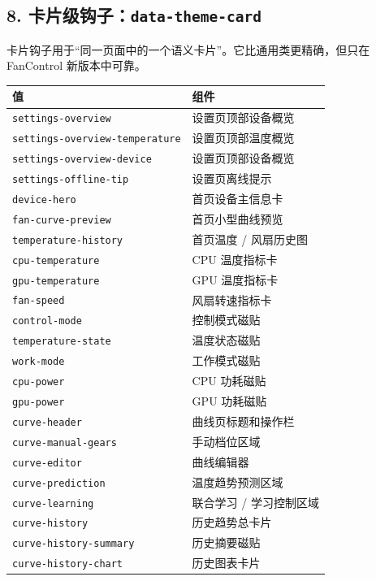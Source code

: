 \documentclass[UTF8,11pt,a4paper]{ctexart}
\begin{document}
\subsection{\texorpdfstring{8.
卡片级钩子：\texttt{data-theme-card}}{8. 卡片级钩子：data-theme-card}}\label{8-ux5361ux7247ux7ea7ux94a9ux5b50data-theme-card}

卡片钩子用于``同一页面中的一个语义卡片''。它比通用类更精确，但只在
FanControl 新版本中可靠。

\begin{longtable}[]{@{}L{0.36\textwidth}L{0.58\textwidth}@{}}
\toprule\noalign{}
值 & 组件 \\
\midrule\noalign{}
\endhead
\bottomrule\noalign{}
\endlastfoot
\texttt{settings-overview} & 设置页顶部设备概览 \\
\texttt{settings-overview-temperature} & 设置页顶部温度概览 \\
\texttt{settings-overview-device} & 设置页顶部设备概览 \\
\texttt{settings-offline-tip} & 设置页离线提示 \\
\texttt{device-hero} & 首页设备主信息卡 \\
\texttt{fan-curve-preview} & 首页小型曲线预览 \\
\texttt{temperature-history} & 首页温度 / 风扇历史图 \\
\texttt{cpu-temperature} & CPU 温度指标卡 \\
\texttt{gpu-temperature} & GPU 温度指标卡 \\
\texttt{fan-speed} & 风扇转速指标卡 \\
\texttt{control-mode} & 控制模式磁贴 \\
\texttt{temperature-state} & 温度状态磁贴 \\
\texttt{work-mode} & 工作模式磁贴 \\
\texttt{cpu-power} & CPU 功耗磁贴 \\
\texttt{gpu-power} & GPU 功耗磁贴 \\
\texttt{curve-header} & 曲线页标题和操作栏 \\
\texttt{curve-manual-gears} & 手动档位区域 \\
\texttt{curve-editor} & 曲线编辑器 \\
\texttt{curve-prediction} & 温度趋势预测区域 \\
\texttt{curve-learning} & 联合学习 / 学习控制区域 \\
\texttt{curve-history} & 历史趋势总卡片 \\
\texttt{curve-history-summary} & 历史摘要磁贴 \\
\texttt{curve-history-chart} & 历史图表卡片 \\
\end{longtable}
\end{document}
